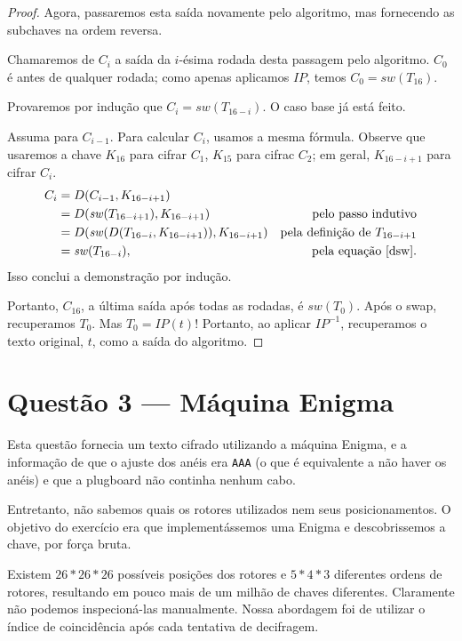 \documentclass{article}
\newcommand{\sw}{\mathit{sw}}
\newcommand{\IP}{\mathit{IP}}
\begin{document}
\begin{proof}
    Agora, passaremos esta saída novamente pelo algoritmo,
    mas fornecendo as subchaves na ordem reversa.

    Chamaremos de $C_i$ a saída da $i$-ésima rodada
    desta passagem pelo algoritmo.
    $C_0$ é antes de qualquer rodada;
    como apenas aplicamos $\IP$,
    temos $C_0 = \sw(T_{16})$.

    Provaremos por indução que $C_i = \sw(T_{16-i})$.
    O caso base já está feito.

    Assuma para $C_{i-1}$.
    Para calcular $C_i$,
    usamos a mesma fórmula.
    Observe que usaremos a chave $K_{16}$ para cifrar $C_1$,
    $K_{15}$ para cifrac $C_2$;
    em geral, $K_{16 - i + 1}$ para cifrar $C_i$.
    \begin{align*}
        C_i &= D(C_{i-1}, K_{16-i+1}) \\
            &= D(\sw(T_{16-i+1}), K_{16-i+1})   & \text{pelo passo indutivo} \\
            &= D(\sw(D(T_{16-i}, K_{16-i+1})), K_{16-i+1}) &
                \text{pela definição de $T_{16-i+1}$} \\
            &= \sw(T_{16-i}), &\text{pela equação \ref{dsw}}.
    \end{align*}
    Isso conclui a demonstração por indução.

    Portanto, $C_{16}$, a última saída após todas as rodadas,
    é $\sw(T_0)$.
    Após o swap, recuperamos $T_0$.
    Mas $T_0 = \IP(t)$!
    Portanto, ao aplicar $\IP^{-1}$,
    recuperamos o texto original, $t$,
    como a saída do algoritmo.
\end{proof}

\section{Questão 3 --- Máquina Enigma}

Esta questão fornecia um texto cifrado utilizando a máquina Enigma,
e a informação de que o ajuste dos anéis era \texttt{AAA}
(o que é equivalente a não haver os anéis)
e que a plugboard não continha nenhum cabo.

Entretanto, não sabemos quais os rotores utilizados
nem seus posicionamentos.
O objetivo do exercício era que implementássemos uma Enigma
e descobrissemos a chave, por força bruta.

Existem $26*26*26$ possíveis posições dos rotores
e $5*4*3$ diferentes ordens de rotores,
resultando em pouco mais de um milhão de chaves diferentes.
Claramente não podemos inspecioná-las manualmente.
Nossa abordagem foi de utilizar o índice de coincidência
após cada tentativa de decifragem.
\end{document}
